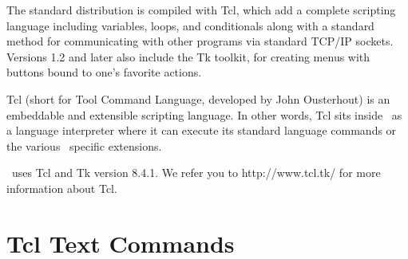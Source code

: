 The standard distribution is compiled with Tcl, which add a complete
scripting language including variables, loops, and conditionals along with a
standard method for communicating with other programs via standard TCP/IP
sockets. Versions 1.2 and later also include the Tk toolkit, for creating
menus with buttons bound to one's favorite actions.

Tcl (short for Tool Command Language, developed by John Ousterhout) is
an embeddable and extensible scripting language.  In other words, Tcl
sits inside \VMD\ as a language interpreter where it can execute its
standard language commands or the various \VMD\ specific extensions.

\VMD\ uses Tcl and Tk version 8.4.1.  We refer you to 
	{http://www.tcl.tk/}
for more information about Tcl. 

\section{Tcl Text Commands}
\label{ug:section:text}

